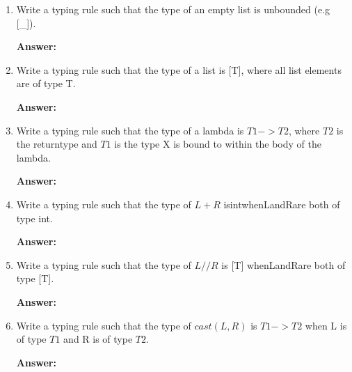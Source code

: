 \documentclass[a4paper]{exam}
\theoremstyle{definition}
\begin{document}
\begin{enumerate}
  \item Write a typing rule such that the type of an empty list is unbounded (e.g [\_]).

        \textbf{Answer:}

  \item  Write a typing rule such that the type of a list is [T], where all list elements are of type T.

        \textbf{Answer:}

  \item Write a typing rule such that the type of a lambda is $T1->T2$, where $T2$ is the returntype and $T1$ is the type X is bound to within the body of the lambda.

        \textbf{Answer:}

  \item Write a typing rule such that the type of $L + R$ isintwhenLandRare both of type int.

        \textbf{Answer:}

  \item Write a typing rule such that the type of $L // R$ is [T] whenLandRare both of type [T].

        \textbf{Answer:}
  \item Write a typing rule such that the type of $cast(L,R)$ is $T1 -> T2$ when L is of type $T1$ and R is of type $T2$.

        \textbf{Answer:}

\end{enumerate}
\end{document}
